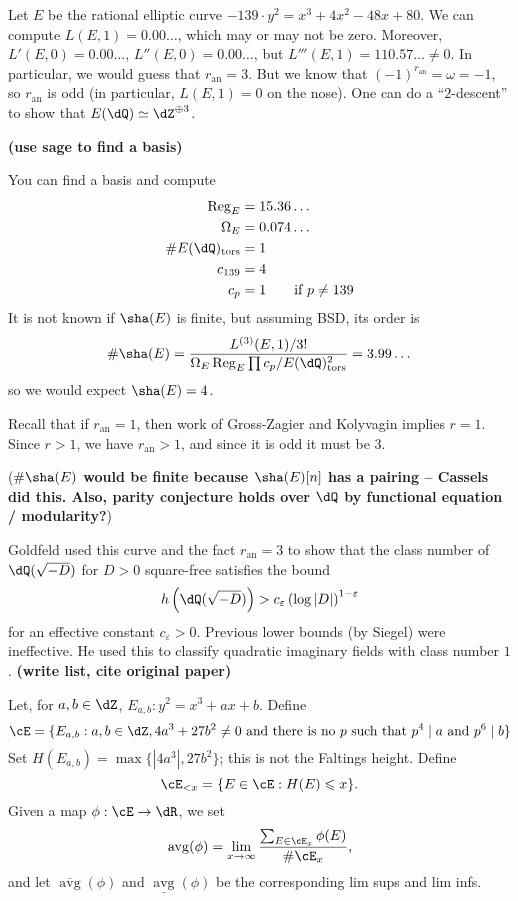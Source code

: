 \begin{example}
Let $E$ be the rational elliptic curve $-139\cdot y^2=x^3+4 x^2 - 48 x+80$. 
We can compute $L(E,1) = 0.00\dots$, which may or may not be zero. Moreover, 
$L'(E,0)=0.00\dots$, $L''(E,0) = 0.00\ldots$, but 
$L'''(E,1) = 110.57\dots\ne 0$. In particular, we would guess that 
$r_\text{an}=3$. But we know that $(-1)^{r_\text{an}}=\omega=-1$, so 
$r_\text{an}$ is odd (in particular, $L(E,1)=0$ on the nose). One can do a 
``$2$-descent'' to show that $E(\dQ)\simeq \dZ^{\oplus 3}$. 

\textbf{(use sage to find a basis)}

You can find a basis and compute 
\begin{align*}
  \regulator_E &= 15.36\dots \\
  \Omega_E &= 0.074\ldots \\
  \# E(\dQ)_\text{tors} &= 1 \\
  c_{139} &= 4 \\
  c_p &= 1 \qquad \text{if $p\ne 139$}
\end{align*}
It is not known if $\sha(E)$ is finite, but assuming BSD, its order is 
\[
  \# \sha(E) = \frac{L^{(3)}(E,1)/3!}{\Omega_E \regulator_E \prod c_p / E(\dQ)_\text{tors}^2} = 3.99\dots
\]
so we would expect $\sha(E)=4$. 

Recall that if $r_\text{an}=1$, then work of Gross-Zagier and Kolyvagin implies 
$r=1$. Since $r>1$, we have $r_\text{an}>1$, and since it is odd it must be 
$3$. 
\end{example}

(\textbf{$\#\sha(E)$ would be finite because $\sha(E)[n]$ has a pairing -- 
Cassels did this. Also, parity conjecture holds over $\dQ$ by functional 
equation / modularity?})

Goldfeld used this curve and the fact $r_\text{an}=3$ to show that the class 
number of $\dQ(\sqrt{-D})$ for $D>0$ square-free satisfies the bound 
\[
  h\left(\dQ(\sqrt{-D})\right) > c_\varepsilon \left(\log|D|\right)^{1-\varepsilon}
\]
for an effective constant $c_\varepsilon>0$. Previous lower bounds (by Siegel) 
were ineffective. He used this to classify quadratic imaginary fields with 
class number $1$. \textbf{(write list, cite original paper)}



Let, for $a,b\in \dZ$, $E_{a,b}:y^2=x^3+a x+b$. Define 
\[
  \cE = \{E_{a,b} : a,b\in \dZ, 4 a^3+27 b^2\ne 0\text{ and there is no $p$ such that $p^4\mid a$ and $p^6\mid b$}\}
\] 
Set $H(E_{a,b}) = \max\{|4 a^3|, 27 b^2\}$; this is not the Faltings height. 
Define 
\[
  \cE_{<x} = \{E\in \cE : H(E)\leqslant x\} \text{.}
\]
Given a map $\phi:\cE\to \dR$, we set 
\[
  \operatorname{avg}(\phi) = \lim_{x\to \infty} \frac{ \sum_{E\in \cE_x} \phi(E)}{\# \cE_x} \text{,}
\]
and let $\overline{\operatorname{avg}}(\phi)$ and 
$\underline{\operatorname{avg}}(\phi)$ be the corresponding lim sups and lim 
infs. 

